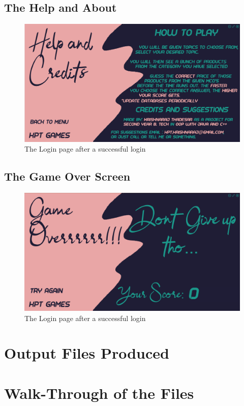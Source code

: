 \documentclass[11pt]{article}
\begin{document}
\subsection{The Help and About}
\begin{figure}[H]
	\centering
	\includegraphics[scale=0.30]{./design/Screenshots/Help and Credits.png}
	\caption{The Login page after a successful login}
\end{figure}
\subsection{The Game Over Screen}
\begin{figure}[H]
	\centering
	\includegraphics[scale=0.30]{./design/Screenshots/Game Over.png}
	\caption{The Login page after a successful login}
\end{figure}
\section{Output Files Produced}


\section{Walk-Through of the Files}
\end{document}
